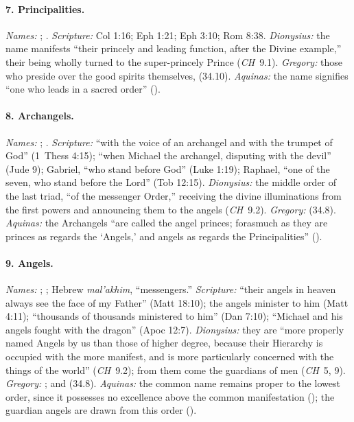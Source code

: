 \paragraph{7. Principalities.} \emph{Names:} ;
. \emph{Scripture:} Col 1:16; Eph 1:21; Eph 3:10; Rom 8:38.
\emph{Dionysius:} the name manifests ``their princely and leading
function, after the Divine example,'' their being wholly turned to the
super-princely Prince (\emph{CH}~9.1). \emph{Gregory:} those who
preside over the good spirits themselves,  (34.10). \emph{Aquinas:} the name
signifies ``one who leads in a sacred order'' ().

\paragraph{8. Archangels.} \emph{Names:} ;
. \emph{Scripture:} ``with the voice of an archangel
and with the trumpet of God'' (1~Thess 4:15); ``when Michael the
archangel, disputing with the devil'' (Jude 9); Gabriel, ``who stand
before God'' (Luke 1:19); Raphael, ``one of the seven, who stand before
the Lord'' (Tob 12:15). \emph{Dionysius:} the middle order of the last
triad, ``of the messenger Order,'' receiving the divine illuminations
from the first powers and announcing them to the angels (\emph{CH}~9.2). \emph{Gregory:}  (34.8). \emph{Aquinas:} the Archangels ``are called the
angel princes; forasmuch as they are princes as regards the `Angels,'
and angels as regards the Principalities'' ().

\paragraph{9. Angels.} \emph{Names:} ; ;
Hebrew \emph{mal'akhim}, ``messengers.'' \emph{Scripture:} ``their
angels in heaven always see the face of my Father'' (Matt 18:10); the
angels minister to him (Matt 4:11); ``thousands of thousands ministered
to him'' (Dan 7:10); ``Michael and his angels fought with the dragon''
(Apoc 12:7). \emph{Dionysius:} they are ``more properly named Angels by
us than those of higher degree, because their Hierarchy is occupied
with the more manifest, and is more particularly concerned with the
things of the world'' (\emph{CH}~9.2); from them come the guardians of
men (\emph{CH}~5, 9). \emph{Gregory:} ; and  (34.8). \emph{Aquinas:} the common
name remains proper to the lowest order, since it possesses no
excellence above the common manifestation ();
the guardian angels are drawn from this order ().

